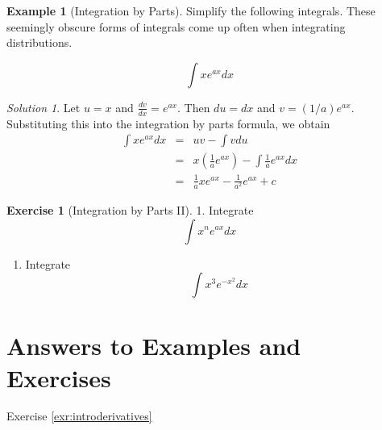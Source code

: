 \documentclass[
]{book}
\providecommand{\tightlist}{%
  \setlength{\itemsep}{0pt}\setlength{\parskip}{0pt}}
\theoremstyle{definition}
\theoremstyle{definition}
\newtheorem{example}{Example}[chapter]
\theoremstyle{definition}
\newtheorem{exercise}{Exercise}[chapter]
\theoremstyle{remark}
\newtheorem*{solution}{Solution}
\begin{document}
\begin{example}[Integration by Parts]
\protect\hypertarget{exm:unnamed-chunk-31}{}{\label{exm:unnamed-chunk-31} {} }Simplify the following integrals. These seemingly obscure forms of integrals come up often when integrating distributions.

\[\int x e^{ax} dx\]
\end{example}

\begin{solution}
{}
Let \(u=x\) and \(\frac{dv}{dx} = e^{ax}\). Then \(du=dx\) and \(v=(1/a)e^{ax}\). Substituting this into the integration by parts formula, we obtain\\
\begin{eqnarray}
\int x e^{ax} dx &=& u v - \int v du\nonumber\\
                &=&x\left( \frac{1}{a}e^{ax}\right) -\int\frac{1}{a}e^{ax}dx\nonumber\\
                &=&\frac{1}{a}xe^{ax}-\frac{1}{a^2}e^{ax}+c\nonumber
\end{eqnarray}
\end{solution}

\begin{exercise}[Integration by Parts II]
\protect\hypertarget{exr:intparts-adv}{}{\label{exr:intparts-adv} {} }
1. Integrate
\[\int x^n e^{ax} dx\]

\begin{enumerate}
\def\labelenumi{\arabic{enumi}.}
\setcounter{enumi}{1}
\tightlist
\item
  Integrate
  \[\int x^3 e^{-x^2} dx\]
\end{enumerate}
\end{exercise}

\hypertarget{answers-to-examples-and-exercises-1}{%
\section*{Answers to Examples and Exercises}\label{answers-to-examples-and-exercises-1}}

Exercise \ref{exr:introderivatives}
\end{document}
